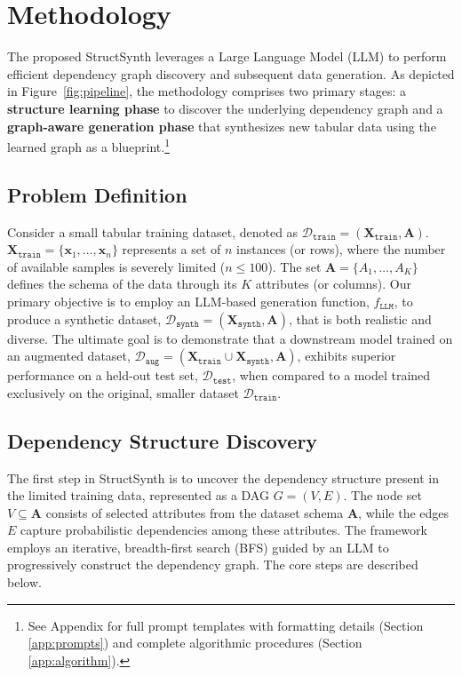 \section{Methodology}

The proposed \textsf{StructSynth} leverages a Large Language Model (LLM) to perform efficient dependency graph discovery and subsequent data generation. As depicted in Figure~\ref{fig:pipeline}, the methodology comprises two primary stages: a \textbf{structure learning phase} to discover the underlying dependency graph and a \textbf{graph-aware generation phase} that synthesizes new tabular data using the learned graph as a blueprint.\footnote{See Appendix for full prompt templates with formatting details (Section \ref{app:prompts}) and complete algorithmic procedures (Section \ref{app:algorithm}).}

\subsection{Problem Definition}

Consider a small tabular training dataset, denoted as $\mathcal{D}_{\mathtt{train}} = (\mathbf{X}_{\mathtt{train}}, \mathbf{A})$. $\mathbf{X}_{\mathtt{train}} = \{\mathbf{x}_1, \ldots, \mathbf{x}_n\}$ represents a set of $n$ instances (or rows), where the number of available samples is severely limited ($n \le 100$). The set $\mathbf{A} = \{A_1, \ldots, A_K\}$ defines the schema of the data through its $K$ attributes (or columns). Our primary objective is to employ an LLM-based generation function, $f_{\mathtt{LLM}}$, to produce a synthetic dataset, $\mathcal{D}_{\mathtt{synth}} = (\mathbf{X}_{\mathtt{synth}}, \mathbf{A})$, that is both realistic and diverse. The ultimate goal is to demonstrate that a downstream model trained on an augmented dataset, $\mathcal{D}_{\mathtt{aug}} = (\mathbf{X}_{\mathtt{train}} \cup \mathbf{X}_{\mathtt{synth}}, \mathbf{A})$, exhibits superior performance on a held-out test set, $\mathcal{D}_{\mathtt{test}}$, when compared to a model trained exclusively on the original, smaller dataset $\mathcal{D}_{\mathtt{train}}$.

\subsection{Dependency Structure Discovery}

The first step in \textsf{StructSynth} is to uncover the dependency structure present in the limited training data, represented as a DAG $G = (V, E)$. The node set $V \subseteq \mathbf{A}$ consists of selected attributes from the dataset schema $\mathbf{A}$, while the edges $E$ capture probabilistic dependencies among these attributes. The framework employs an iterative, breadth-first search (BFS) guided by an LLM to progressively construct the dependency graph. The core steps are described below.

